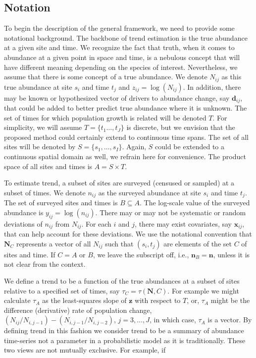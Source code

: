 \documentclass[12pt,letter]{article}
\newcommand{\Nij}{\ensuremath{N_{ij}}}
\newcommand{\nij}{\ensuremath{n_{ij}}}
\newcommand{\zij}{\ensuremath{z_{ij}}}
\newcommand{\yij}{\ensuremath{y_{ij}}}
\newcommand{\bx}{\ensuremath{\mathbf{x}}}
\begin{document}
\subsection{Notation}

To begin the description of the general framework, we need to provide some notational background. The backbone of trend estimation is the true abundance at a given site and time. We recognize the fact that truth, when it comes to abundance at a given point in space and time, is a nebulous concept that will have different meaning depending on the species of interest. Nevertheless, we assume that there is some concept of a true abundance. We denote $\Nij$ as this true abundance at site $s_i$ and time $t_j$ and $\zij=\log(\Nij)$. In addition, there may be known or hypothesized vector of drivers to abundance change, say $\mathbf{d}_{ij}$, that could be added to better predict true abundance where it is unknown. The set of times for which population growth is related will be denoted $T$. For simplicity, we will assume $T = \{t_1\dots,t_J\}$ is discrete, but we envision that the proposed method could certainly extend to continuous time spans.  The set of all sites will be denoted by $S = \{s_1,\dots,s_I\} $. Again, $S$ could be extended to a continuous spatial domain as well, we refrain here for convenience. The product space of all sites and times is $A = S \times T$.

To estimate trend, a subset of sites are surveyed (censused or sampled) at a subset of times. We denote $\nij$ as the surveyed abundance at site $s_i$ and time $t_j$. The set of surveyed sites and times is $B\subseteq A$. The log-scale value of the surveyed abundance is $\yij=\log(\nij)$. There may or may not be systematic or random deviations of $\nij$ from $\Nij$. For each $i$ and $j$, there may exist covariates, say $\bx_{ij}$, that can help account for these deviations. We use the notational convention that $\mathbf{N}_C$ represents a vector of all $\Nij$ such that $(s_i, t_j)$ are elements of the set $C$ of sites and time. If $C=A$ or $B$, we leave the subscript off, i.e., $\mathbf{n}_B = \mathbf{n}$, unless it is not clear from the context.

We define a trend to be a function of the true abundances at a subset of sites relative to a specified set of times, say $\tau_C=\tau(\mathbf{N}, C)$. For example we might calculate $\tau_A$ as the least-squares slope of $\mathbf{z}$ with respect to $T$, or, $\tau_A$ might be the difference (derivative) rate of population change, $(\Nij/N_{i,j-1}) - (N_{i,j-1}/N_{i,j-2})$, $j=3,\dots,J$, in which case, $\tau_A$ is a vector. By defining trend in this fashion we consider trend to be a summary of abundance time-series not a parameter in a probabilistic model as it is traditionally. These two views are not mutually exclusive. For example, if 
 
\end{document}
